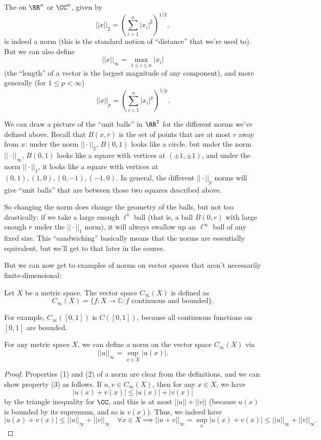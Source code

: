 \begin{example}
The  on $\RR^n$ or $\CC^n$, given by 
\[
    ||x||_2 = \left( \sum_{i=1}^n |x_i|^2\right)^{1/2},
\]
is indeed a norm (this is the standard notion of ``distance'' that we're used to). But we can also define 
\[
    ||x||_{\infty} = \max_{1 \le i \le n} |x_i|
\]
(the ``length'' of a vector is the largest magnitude of any component), and more generally (for $1 \le p < \infty$)
\[
    ||x||_p = \left(\sum_{i=1}^n |x_i|^p\right)^{1/p}.
\]
\end{example}

We can draw a picture of the ``unit balls'' in $\RR^2$ for the different norms we've defined above. Recall that $B(x, r)$ is the set of points that are at most $r$ away from $x$: under the norm $||\cdot||_2$, $B(0, 1)$ looks like a circle, but under the norm $||\cdot||_\infty$, $B(0, 1)$ looks like a square with vertices at $(\pm 1, \pm 1)$, and under the norm $||\cdot||_1$, it looks like a square with vertices at $(0, 1), (1, 0), (0, -1), (-1, 0)$. In general, the different $||\cdot||_p$ norms will give ``unit balls'' that are between those two squares described above. 

So changing the norm does change the geometry of the balls, but not too drastically: if we take a large enough $\ell^1$ ball (that is, a ball $B(0, r)$ with large enough $r$ under the $||\cdot||_1$ norm), it will always swallow up an $\ell^\infty$ ball of any fixed size. This ``sandwiching'' basically means that the norms are essentially equivalent, but we'll get to that later in the course. 

But we can now get to examples of norms on vector spaces that aren't necessarily finite-dimensional: 
\begin{definition}
Let $X$ be a metric space. The vector space $C_{\infty}(X)$ is defined as
\[
    C_{\infty}(X) = \{f: X \to \mathbb{C}: f \text{ continuous and bounded}\}. 
\]
\end{definition}
For example, $C_{\infty}([0, 1])$ is $C([0, 1])$, because all continuous functions on $[0, 1]$ are bounded. 

\begin{proposition}
For any metric space $X$, we can define a norm on the vector space $C_{\infty}(X)$ via 
\[
    ||u||_{\infty} = \sup_{x \in X} |u(x)|.
\]
\end{proposition}
\begin{proof}
Properties (1) and (2) of a norm are clear from the definitions, and we can show property (3) as follows. If $u, v \in C_{\infty}(X)$, then for any $x \in X$, we have 
\[
    |u(x) + v(x)| \le |u(x)| + |v(x)|
\]
by the triangle inequality for $\CC$, and this is at most $||u|| + ||v||$ (because $u(x)$ is bounded by its supremum, and so is $v(x)$). Thus, we indeed have 
\[
    |u(x) + v(x)| \le ||u||_\infty + ||v||_\infty \quad \forall x \in X \implies ||u + v||_\infty = \sup_{x} |u(x) + v(x)| \le ||u||_\infty + ||v||_\infty.
\]
\end{proof}

